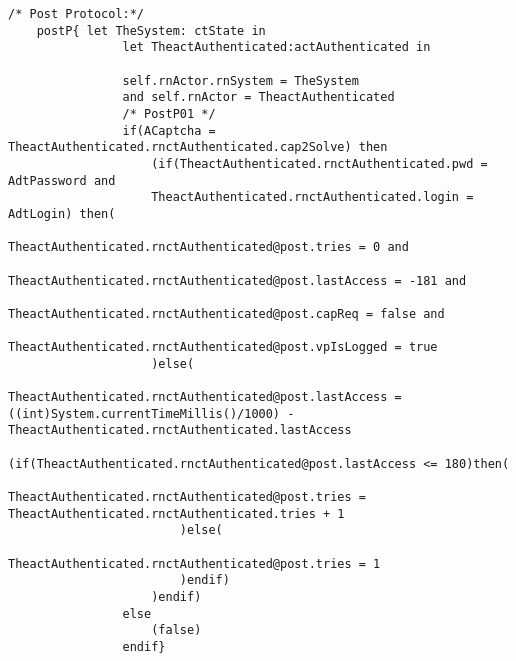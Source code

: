 \begin{lstlisting}[style=MessirStyle,firstnumber=auto,captionpos=b,caption={\msrmessir (MCL-oriented) specification of the operation \emph{oeLoginWithCaptcha}.},label=OM-actAuthenticated-oeLoginWithCaptcha-MCL-LST]
	/* Post Protocol:*/ 
	postP{ let TheSystem: ctState in
				let TheactAuthenticated:actAuthenticated in
				
				self.rnActor.rnSystem = TheSystem
				and self.rnActor = TheactAuthenticated
				/* PostP01 */
				if(ACaptcha = TheactAuthenticated.rnctAuthenticated.cap2Solve) then
					(if(TheactAuthenticated.rnctAuthenticated.pwd = AdtPassword and
					TheactAuthenticated.rnctAuthenticated.login = AdtLogin) then(
						TheactAuthenticated.rnctAuthenticated@post.tries = 0 and
						TheactAuthenticated.rnctAuthenticated@post.lastAccess = -181 and
						TheactAuthenticated.rnctAuthenticated@post.capReq = false and
						TheactAuthenticated.rnctAuthenticated@post.vpIsLogged = true
					)else(
						TheactAuthenticated.rnctAuthenticated@post.lastAccess = ((int)System.currentTimeMillis()/1000) - TheactAuthenticated.rnctAuthenticated.lastAccess
						(if(TheactAuthenticated.rnctAuthenticated@post.lastAccess <= 180)then(
							TheactAuthenticated.rnctAuthenticated@post.tries = TheactAuthenticated.rnctAuthenticated.tries + 1
						)else(
							TheactAuthenticated.rnctAuthenticated@post.tries = 1
						)endif)
					)endif)
				else 
					(false)
				endif}
	
	\end{lstlisting}
	\normalsize 
	
	
	
	





